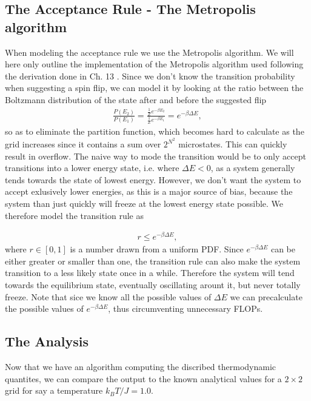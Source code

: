 \documentclass[twocolumn]{aastex62}
\begin{document}
\subsection{The Acceptance Rule - The Metropolis algorithm}
When modeling the acceptance rule we use the Metropolis algorithm. We will here
only outline the implementation of the Metropolis algorithm used following the
derivation done in Ch. 13 \cite{jensen:2015}. Since we don't know the transition
probability when suggesting a spin flip, we can model it by looking at the ratio
between the Boltzmann distribution of the state after and before the suggested
flip 
\begin{align}
	\frac{P(E_2)}{P(E_1)} = \frac{\frac{1}{Z}e^{-\beta E_2}}{\frac{1}{Z}e^{-\beta E_1}} = e^{-\beta\Delta E},
\end{align}
so as to eliminate the partition function, which becomes hard to calculate as
the grid increases since it contains a sum over $2^{N^2}$ microstates. This can
quickly result in overflow. The naive way to mode the transition would be to
only accept transitions into a lower energy state, i.e. where $\Delta E < 0$, as
a system generally tends towards the state of lowest energy. However, we don't want the
system to accept exlusively lower energies, as this is a major source of bias,
because the system than just quickly will freeze at the lowest energy state
possible. We therefore model the transition rule as 

\begin{align}
	r \leq e^{-\beta\Delta E},
\end{align}
where $r\in [0, 1]$ is a number drawn from a uniform PDF. Since $e^{-\beta\Delta
E}$ can be either greater or smaller than one, the transition rule can also make
the system transition to a less likely state once in a while. Therefore the
system will tend towards the equilibrium state, eventually oscillating arount
it, but never totally freeze.
Note that sice we know all the possible values of $\Delta E$ we can precalculate
the possible values of $e^{-\beta\Delta E}$, thus circumventing unnecessary
FLOPs.

\subsection{The Analysis}
Now that we have an algorithm computing the discribed thermodynamic quantites,
we can compare the output to the known analytical values for a $2\times 2$ grid
for say a temperature $k_BT/J = 1.0$.
\end{document}

